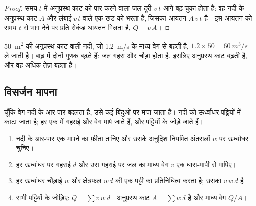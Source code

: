\begin{proof}
समय $t$ में अनुप्रस्थ काट को पार करने वाला जल
दूरी $v\,t$ आगे बढ़ चुका होता है: वह नदी के अनुप्रस्थ काट $A$ और
लंबाई $v\,t$ वाले एक खंड को भरता है, जिसका आयतन $A\,v\,t$ है। इस आयतन को समय $t$ से भाग देने पर
प्रति सेकंड आयतन मिलता है, $Q = v\,A$।
\end{proof}

\qty{50}{m^2} की अनुप्रस्थ काट वाली नदी, जो \qty{1.2}{m/s} के माध्य वेग से बहती है,
$1.2 \times 50 = \qty{60}{m^3/s}$ ले जाती है। बाढ़ में दोनों
गुणक बढ़ते हैं: जल गहरा और चौड़ा होता है, इसलिए अनुप्रस्थ काट बढ़ती है, और
वह अधिक तेज़ बहता है।

\subsection*{विसर्जन मापना}

चूँकि वेग नदी के आर-पार बदलता है, उसे कई
बिंदुओं पर मापा जाता है। नदी को ऊर्ध्वाधर पट्टियों में काटा जाता है; हर एक में गहराई और
वेग मापे जाते हैं, और पट्टियों के  जोड़े जाते हैं।

\begin{method}[वेग--क्षेत्रफल विधि]\label{met:g10:drainage-basins:velocity-area}
\begin{enumerate}
  \item नदी के आर-पार एक मापने का फ़ीता तानिए और उसके अनुदिश नियमित अंतरालों $w$ पर
        ऊर्ध्वाधर चुनिए।
  \item हर ऊर्ध्वाधर पर गहराई $d$ और उस गहराई पर जल का माध्य वेग $v$
        एक धारा-मापी से मापिए।
  \item हर ऊर्ध्वाधर चौड़ाई $w$ और क्षेत्रफल $w\,d$ की एक पट्टी का प्रतिनिधित्व करता है; उसका
         $v\,w\,d$ है।
  \item सभी पट्टियों के  जोड़िए: $Q = \sum v\,w\,d$।
        अनुप्रस्थ काट $A = \sum w\,d$ है और माध्य वेग $Q/A$।
\end{enumerate}
\end{method}


